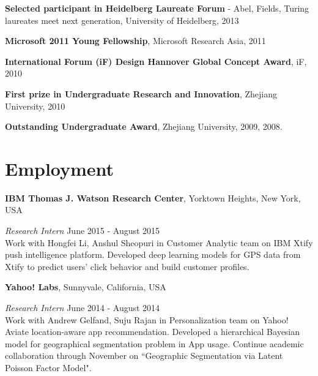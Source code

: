 \documentclass[margin,line]{res}
\begin{document}
\begin{resume}


%

\textbf{Selected participant in Heidelberg Laureate Forum }- Abel, Fields, Turing laureates meet next generation, University of Heidelberg, 2013


\textbf{Microsoft 2011 Young Fellowship}, Microsoft Research Asia, 2011


\textbf{International Forum (iF) Design Hannover Global Concept Award}, iF, 2010 

\textbf{First prize in Undergraduate Research and Innovation}, Zhejiang University, 2010   

\textbf{Outstanding Undergraduate Award}, Zhejiang University, 2009, 2008. 

\section{\sc Employment} 
{\bf  IBM Thomas J. Watson Research Center}, Yorktown Heights, New York, USA

\vspace{-.3cm}
{\em Research Intern} \hfill {June 2015 - August 2015}\\ %
Work with Hongfei Li, Anshul Sheopuri in Customer Analytic team on IBM Xtify push intelligence platform. Developed deep learning models for GPS data from Xtify to predict users' click behavior and build customer profiles. 


{\bf  Yahoo! Labs}, Sunnyvale, California, USA

\vspace{-.3cm}
{\em Research Intern} \hfill { June 2014 - August 2014}\\ %
Work with Andrew Gelfand, Suju Rajan in Personalization team on Yahoo! Aviate location-aware app recommendation. Developed a hierarchical Bayesian model for geographical segmentation problem in App usage. Continue academic collaboration through November on ``Geographic Segmentation via Latent Poisson Factor Model".




\end{resume}
\end{document}
